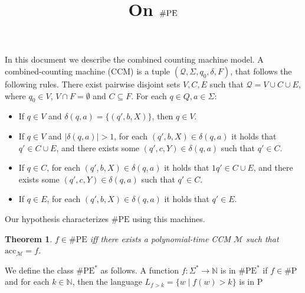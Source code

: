 \documentclass[12pt]{article}
\title{On $\pe$}
\newtheorem{theorem}{Theorem}
\def\pe{\#\text{PE}}
\def\ptime{\text{P}}
\def\shp{\#\text{P}}
\def\acc{\text{acc}}
\def\Q{\mathcal{Q}}
\def\M{\mathcal{M}}
\def\N{\mathbb{N}}
\begin{document}
	\maketitle
	
	In this document we describe the combined counting machine model. A combined-counting machine (CCM) is a tuple $(\Q,\Sigma,q_0,\delta,F)$, that follows the following rules. There exist pairwise disjoint sets $V,C,E$ such that $\Q = V\cup C \cup E$, where $q_0\in V$, $V \cap F = \emptyset$ and $C \subseteq F$. For each $q \in Q, a \in \Sigma$:
	\begin{itemize}
	\item If $q\in V$ and $\delta(q,a) = \{(q',b,X)\}$, then $q\in V$.
	\item If $q\in V$ and $\vert\delta(q,a)\vert > 1$, for each $(q',b,X) \in \delta(q,a)$ it holds that $q'\in C \cup E$, and there exists some $(q',c,Y) \in \delta(q,a)$ such that $q'\in C$.
	\item If $q\in C$, for each $(q',b,X) \in \delta(q,a)$ it holds that $1q'\in C \cup E$, and there exists some $(q',c,Y) \in \delta(q,a)$ such that $q'\in C$.
	\item If $q\in E$, for each $(q',b,X) \in \delta(q,a)$ it holds that $q'\in E$.
	\end{itemize}
	Our hypothesis characterizes $\pe$ using this machines.
	\begin{theorem}
		$f\in\pe$ iff there exists a polynomial-time CCM $\M$ such that $\acc_{\M} = f$.
	\end{theorem}
	
	We define the class $\pe^*$ as follows. A function $f:\Sigma^*\to\N$ is in $\pe^*$ if $f\in\shp$ and for each $k\in\N$, then the language $L_{f > k} = \{w\mid f(w) > k \}$ is in $\ptime$
\end{document}
